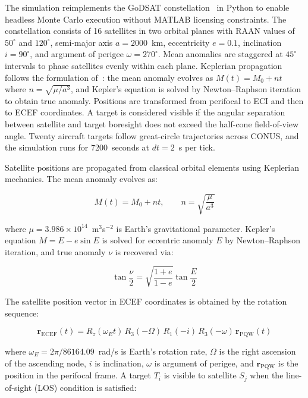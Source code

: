 \documentclass[]{spie}
\begin{document}
The simulation reimplements the GoDSAT constellation~\cite{Saeed2026GoDSATRL} in Python to enable headless Monte Carlo execution without MATLAB licensing constraints. The constellation consists of 16 satellites in two orbital planes with RAAN values of $50^\circ$ and $120^\circ$, semi-major axis $a = 2000$~km, eccentricity $e = 0.1$, inclination $i = 90^\circ$, and argument of perigee $\omega = 270^\circ$. Mean anomalies are staggered at $45^\circ$ intervals to phase satellites evenly within each plane. Keplerian propagation follows the formulation of~\cite{Saeed2026GoDSATRL}: the mean anomaly evolves as $M(t) = M_0 + nt$ where $n = \sqrt{\mu/a^3}$, and Kepler's equation is solved by Newton--Raphson iteration to obtain true anomaly. Positions are transformed from perifocal to ECI and then to ECEF coordinates. A target is considered visible if the angular separation between satellite and target boresight does not exceed the half-cone field-of-view angle. Twenty aircraft targets follow great-circle trajectories across CONUS, and the simulation runs for 7200~seconds at $dt = 2$~s per tick.

Satellite positions are propagated from classical orbital elements using Keplerian mechanics. The mean anomaly evolves as:

\begin{equation}
    M(t) = M_0 + n t, \qquad n = \sqrt{\frac{\mu}{a^3}}
    \label{eq:mean_anomaly}
\end{equation}

where $\mu = 3.986 \times 10^{14}$~m$^3$s$^{-2}$ is Earth's gravitational parameter. Kepler's equation $M = E - e\sin E$ is solved for eccentric anomaly $E$ by Newton--Raphson iteration, and true anomaly $\nu$ is recovered via:

\begin{equation}
    \tan\frac{\nu}{2} = \sqrt{\frac{1+e}{1-e}}
    \tan\frac{E}{2}
    \label{eq:true_anomaly}
\end{equation}

The satellite position vector in ECEF coordinates is obtained by the rotation sequence:

\begin{equation}
    \mathbf{r}_{\mathrm{ECEF}}(t) = 
    R_z(\omega_E t)\, R_3(-\Omega)\, R_1(-i)\, 
    R_3(-\omega)\, \mathbf{r}_{\mathrm{PQW}}(t)
    \label{eq:ecef}
\end{equation}

where $\omega_E = 2\pi/86164.09$~rad/s is Earth's rotation rate, $\Omega$ is the right ascension of the ascending node, $i$ is inclination, $\omega$ is argument of perigee, and $\mathbf{r}_{\mathrm{PQW}}$ is the position in the perifocal frame. A target $T_i$ is visible to satellite $S_j$ when the line-of-sight (LOS) condition is satisfied:
\end{document}
